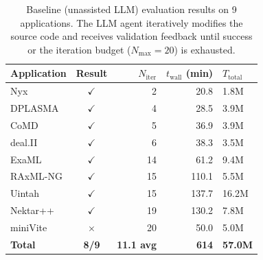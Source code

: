 \begin{table}[t]
\centering
\caption{Baseline (unassisted LLM) evaluation results on 9 applications. The LLM agent iteratively modifies the source code and receives validation feedback until success or the iteration budget ($N_\text{max}=20$) is exhausted.}
\label{tab:baseline-results}
\small
\begin{tabular}{@{}lcrrl@{}}
\toprule
\textbf{Application} & \textbf{Result} & $N_\text{iter}$ & $t_\text{wall}$ \textbf{(min)} & $T_\text{total}$ \\
\midrule
Nyx & $\checkmark$ & 2 & 20.8 & 1.8M \\
DPLASMA & $\checkmark$ & 4 & 28.5 & 3.9M \\
CoMD & $\checkmark$ & 5 & 36.9 & 3.9M \\
deal.II & $\checkmark$ & 6 & 38.3 & 3.5M \\
ExaML & $\checkmark$ & 14 & 61.2 & 9.4M \\
RAxML-NG & $\checkmark$ & 15 & 110.1 & 5.5M \\
Uintah & $\checkmark$ & 15 & 137.7 & 16.2M \\
Nektar++ & $\checkmark$ & 19 & 130.2 & 7.8M \\
miniVite & $\times$ & 20 & 50.0 & 5.0M \\
\midrule
\textbf{Total} & \textbf{8/9} & \textbf{11.1 avg} & \textbf{614} & \textbf{57.0M} \\
\bottomrule
\end{tabular}
\end{table}
